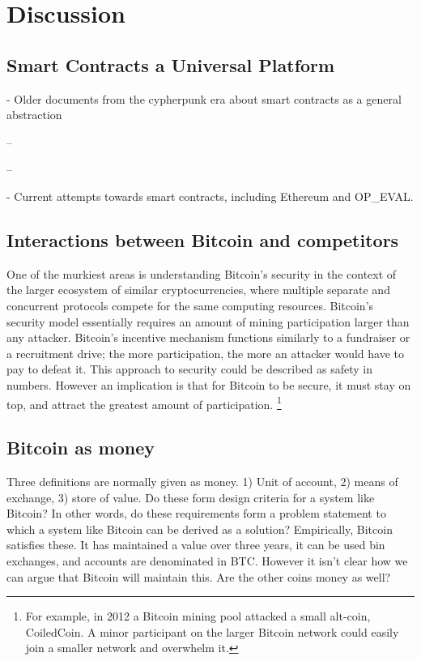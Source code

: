 \section{Discussion}

\subsection{Smart Contracts a Universal Platform}
- Older documents from the cypherpunk era about smart contracts as a general abstraction

-- \cite{miller2001capability}

-- \cite{szabo1997formalizing,bitcointalk-bondmarkets}

- Current attempts towards smart contracts, including Ethereum and OP\_EVAL.

\subsection{Interactions between Bitcoin and competitors}
One of the murkiest areas is understanding Bitcoin's security in the context of the larger ecosystem of similar cryptocurrencies, where multiple separate and concurrent protocols compete for the same computing resources. Bitcoin's security model essentially requires an amount of mining participation larger than any attacker. Bitcoin's incentive mechanism functions similarly to a fundraiser or a recruitment drive; the more participation, the more an attacker would have to pay to defeat it. This approach to security could be described as safety in numbers. However an implication is that for Bitcoin to be secure, it must stay on top, and attract the greatest amount of participation. \footnote{For example, in 2012 a Bitcoin mining pool attacked a small alt-coin, CoiledCoin. A minor participant on the larger Bitcoin network could easily join a smaller network and overwhelm it. }


\subsection{Bitcoin as money}
Three definitions are normally given as money. 1) Unit of account, 2) means of exchange, 3) store of value. Do these form design criteria for a system like Bitcoin? In other words, do these requirements form a problem statement to which a system like Bitcoin can be derived as a solution? Empirically, Bitcoin satisfies these. It has maintained a value over three years, it can be used bin exchanges, and accounts are denominated in BTC. However it isn't clear how we can argue that Bitcoin will maintain this. Are the other coins money as well?

